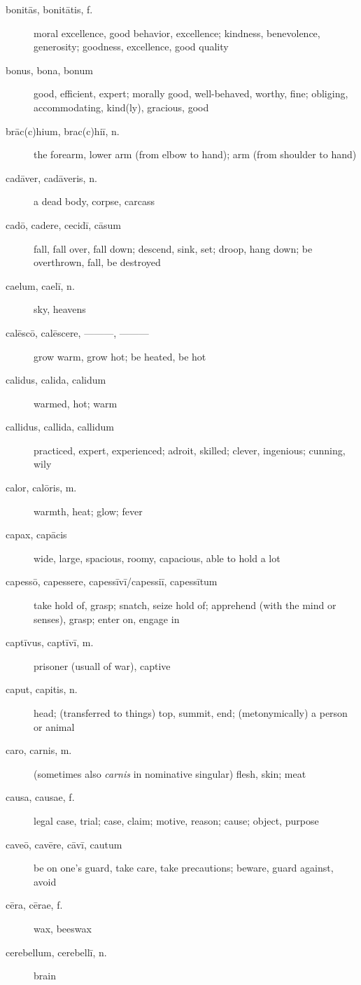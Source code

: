 \begin{description}
    \item[bonitās, bonitātis, f.] moral excellence, good behavior, excellence; kindness, benevolence, generosity; goodness, excellence, good quality
    \item[bonus, bona, bonum] \marginnote{*}good, efficient, expert; morally good, well-behaved, worthy, fine; obliging, accommodating, kind(ly), gracious, good
    \item[brāc(c)hium, brac(c)hiī, n.]  the forearm, lower arm (from elbow to hand); arm (from shoulder to hand)
    \item[cadāver, cadāveris, n.] a dead body, corpse, carcass
    \item[cadō, cadere, cecidī, cāsum] \marginnote{*}fall, fall over, fall down; descend, sink, set; droop, hang down; be overthrown, fall, be destroyed
    \item[caelum, caelī, n.] \marginnote{*} sky, heavens
    \item[calēscō, calēscere, ———, ———] grow warm, grow hot; be heated, be hot
    \item[calidus, calida, calidum] warmed, hot; warm
    \item[callidus, callida, callidum] practiced, expert, experienced; adroit, skilled; clever, ingenious; cunning, wily
    \item[calor, calōris, m.] warmth, heat; glow; fever
    \item[capax, capācis] wide, large, spacious, roomy, capacious, able to hold a lot
    \item[capessō, capessere, capessīvī/capessiī, capessītum] take hold of, grasp; snatch, seize hold of; apprehend (with the mind or senses), grasp; enter on, engage in
    \item[captīvus, captīvī, m.] prisoner (usuall of war), captive
    \item[caput, capitis, n.] \marginnote{*}head; (transferred to things) top, summit, end; (metonymically) a person or animal
    \item[caro, carnis, m.] (sometimes also \textit{carnis} in nominative singular) flesh, skin; meat
    \item[causa, causae, f.] \marginnote{*}legal case, trial; case, claim; motive, reason; cause; object, purpose
    \item[caveō, cavēre, cāvī, cautum] \marginnote{*}be on one's guard, take care, take precautions; beware, guard against, avoid
    \item[cēra, cērae, f.] wax, beeswax
    \item[cerebellum, cerebellī, n.] brain

\end{description}
